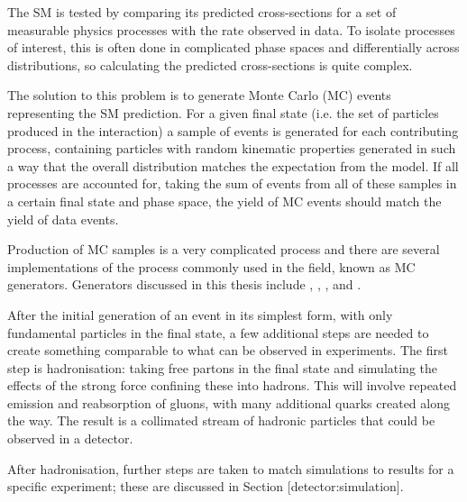 
The \ac{SM} is tested by comparing its predicted cross-sections for a set of
measurable physics processes with the rate observed in data. To isolate
processes of interest, this is often done in complicated phase spaces and
differentially across distributions, so calculating the predicted cross-sections
is quite complex.

The solution to this problem is to generate Monte Carlo (MC) events representing
the \ac{SM} prediction. For a given final state (i.e. the set of particles
produced in the interaction) a sample of events is generated for each
contributing process, containing particles with random kinematic properties
generated in such a way that the overall distribution matches the expectation
from the model. If all processes are accounted for, taking the sum of events
from all of these samples in a certain final state and phase space, the
yield of \ac{MC} events should match the yield of data events.

Production of \ac{MC} samples is a very complicated process and there are
several implementations of the process commonly used in the field, known as
\ac{MC} generators. Generators discussed in this thesis include \madgraph
\cite{madgraph5amc}, \sherpa \cite{sherpa2dot2}, \pythia \cite{pythia8dot2},
and \powheg \cite{powheg}.

After the initial generation of an event in its simplest form, with only
fundamental particles in the final state, a few additional steps are needed to
create something comparable to what can be observed in experiments. The first
step is hadronisation: taking free partons in the final state and simulating the
effects of the strong force confining these into hadrons. This will involve
repeated emission and reabsorption of gluons, with many additional quarks
created along the way. The result is a collimated stream of hadronic particles
that could be observed in a detector.

After hadronisation, further steps are taken to match simulations to results for
a specific experiment; these are discussed in Section [detector:simulation].

